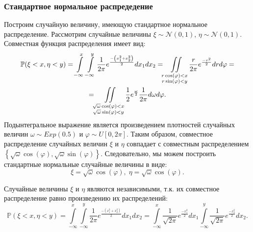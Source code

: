 \documentclass[11pt]{article}
\begin{document}
\subsubsection{Стандартное нормальное распредедение}
Построим случайную величину, имеющую стандартное нормальное распределение. Рассмотрим случайные величины $\xi \sim \mathcal{N}(0, 1)$, $\eta \sim \mathcal{N}(0, 1)$. Совместная функция распределения имеет вид:
\begin{gather}
\mathbb{P}(\xi < x, \eta < y) = \int\limits_{-\infty}^x \int\limits_{-\infty}^y \frac{1}{2\pi} e^{\frac{-\left( x_1^2 + x_2^2 \right) }{2}}  d x_1 d x_2 = \iint \limits_{\substack{r\cos(\varphi) < x \\ r\sin(\varphi) < y}} \frac{r}{2\pi} e^{\frac{-r^2}{2}} d r d\varphi = \notag \\
= \iint\limits_{\substack{\sqrt{\omega} \cos(\varphi) < x \\ \sqrt{\omega} \sin(\varphi) < y}} \frac{1}{2} e^{\frac{\omega}{2}} \frac{1}{2\pi} d\omega d\varphi. \notag
\end{gather}
Подынтегральное выражение является произведением плотностей случайных величин $\omega \sim Exp(0.5)$ и $\varphi \sim U[0, 2\pi]$. Таким образом, совместное распределение случайных величин $\xi$ и $\eta$ совпадает с совместным распределением $\left\{ \sqrt{\omega}\cos(\varphi), \sqrt{\omega}\sin(\varphi) \right\}$. Следовательно, мы можем построить стандартные нормальные случайные величины в виде:
$$
\xi = \sqrt{\omega} \cos(\varphi), \; \eta = \sqrt{\omega} \cos(\varphi).
$$

Случайные величины $\xi$ и $\eta$ являются независимыми, т.к. их совместное распределение равно произведению их распределений:
$$
\mathbb{P}(\xi < x, \eta < y) = \int\limits_{-\infty}^x \int\limits_{-\infty}^y \frac{1}{2\pi} e^{\frac{-\left( x_1^2 + x_2^2 \right) }{2}}  d x_1 d x_2 = \int\limits_{-\infty}^x \frac{1}{\sqrt{2\pi}} e^{\frac{-x_1^2}{2}} d x_1 \int\limits_{-\infty}^y \frac{1}{\sqrt{2\pi}} e^{\frac{-x_2^2}{2}} d x_2.
$$
\end{document}
